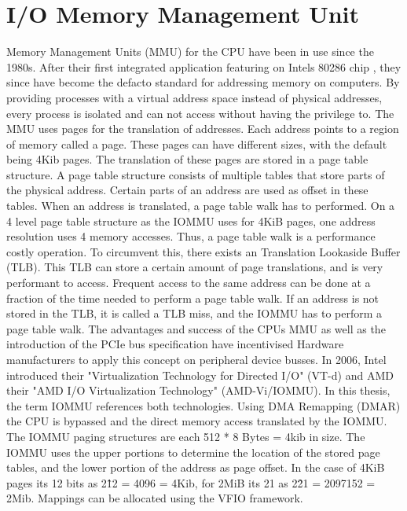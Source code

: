 \section{I/O Memory Management Unit}
Memory Management Units (MMU) for the CPU have been in use since the 1980s. After their first integrated application featuring on Intels 80286 chip \cite{intel80286}, they since have become the defacto standard for addressing memory on computers. By providing processes with a virtual address space instead of physical addresses, every process is isolated and can not access without having the privilege to. The MMU uses pages for the translation of addresses. Each address points to a region of memory called a page. These pages can have different sizes, with the default being 4Kib pages.
The translation of these pages are stored in a page table structure. A page table structure consists of multiple tables that store parts of the physical address. Certain parts of an address are used as offset in these tables. When an address is translated, a page table walk has to performed. On a 4 level page table structure as the IOMMU uses for 4KiB pages, one address resolution uses 4 memory accesses. Thus, a page table walk is a performance costly operation. To circumvent this, there exists an Translation Lookaside Buffer (TLB). This TLB can store a certain amount of page translations, and is very performant to access. Frequent access to the same address can be done at a fraction of the time needed to perform a page table walk. If an address is not stored in the TLB, it is called a TLB miss, and the IOMMU has to perform a page table walk.
The advantages and success of the CPUs MMU as well as the introduction of the PCIe bus specification have incentivised Hardware manufacturers to apply this concept on peripheral device busses. In 2006, Intel introduced their "Virtualization Technology for Directed I/O" (VT-d) and AMD their "AMD I/O Virtualization Technology" (AMD-Vi/IOMMU). In this thesis, the term IOMMU references both technologies.
Using DMA Remapping (DMAR) the CPU is bypassed and the direct memory access translated by the IOMMU.
The IOMMU paging structures are each 512 * 8 Bytes = 4kib in size. The IOMMU uses the upper portions to determine the location of the stored page tables, and the lower portion of the address as page offset. In the case of 4KiB pages its 12 bits as 2\^12 = 4096 = 4Kib, for 2MiB its 21 as 2\^21 = 2097152 = 2Mib.
Mappings can be allocated using the VFIO framework.

